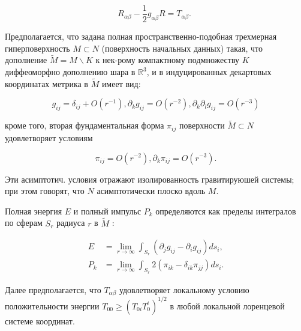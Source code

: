 \documentclass[10pt]{article}
\begin{document}
\[

R_{\alpha \beta}-\frac{1}{2} g_{\alpha \beta} R=T_{\alpha \beta} \text {. }

\]



Предполагается, что задана полная пространственно-подобная трехмерная гиперповерхность $M \subset N$ (поверхность начальных данных) такая, что дополнение $\widetilde{M}=M \backslash K$ к нек-рому компактному подмножеству $K$ диффеоморфно дополнению шара в $\mathbb{R}^{3}$, и в индуцированных декартовых координатах метрика в $\tilde{M}$ имеет вид:



\[

g_{i j}=\delta_{i j}+O\left(r^{-1}\right), \partial_{k} g_{i j}=O\left(r^{-2}\right), \partial_{k} \partial_{l} g_{i j}=O\left(r^{-3}\right)

\]



кроме того, вторая фундаментальная форма $\pi_{i j}$ поверхности $\tilde{M} \subset N$ удовлетворяет условиям



\[

\pi_{i j}=O\left(r^{-2}\right), \partial_{k} \pi_{i j}=O\left(r^{-3}\right) .

\]



Эти асимптотич. условия отражают изолированность гравитируюшей системы; при этом говорят, что $N$ асимптотически плоско вдоль $M$.



Полная энергия $E$ и полный импульс $P_{k}$ определяются как пределы интегралов по сферам $S_{r}$ радиуса $r$ в $\widetilde{M}$ :



\[

\begin{aligned}

E & =\lim _{r \rightarrow \infty} \int_{S_{r}}\left(\partial_{j} g_{i j}-\partial_{i} g_{i j}\right) d s_{i}, \\

P_{k} & =\lim _{r \rightarrow \infty} \int_{S_{r}} 2\left(\pi_{i k}-\delta_{i k} \pi_{j j}\right) d s_{i} .

\end{aligned}

\]



Далее предполагается, что $T_{\alpha \beta}$ удовлетворяет локальному условию положительности энергии $T_{00} \geqslant\left(T_{0 i} T_{0}^{i}\right)^{1 / 2}$ в любой локальной лоренцевой системе координат.
\end{document}
